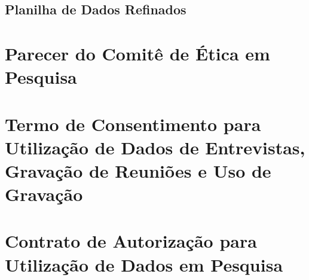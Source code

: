 \begin{anexosenv}
\begin{landscape}
    \chapter{Planilha de Dados Refinados}
    \label{anexo:planilha-refinada}

    
    
    
    
\end{landscape}


\chapter{Parecer do Comitê de Ética em Pesquisa}
\label{anexo:parecer-cep}









\chapter{Termo de Consentimento para Utilização de Dados de Entrevistas, Gravação de Reuniões e Uso de Gravação}
\label{anexo:termo-consentimento}






\chapter{Contrato de Autorização para Utilização de Dados em Pesquisa}
\label{anexo:contrato-autorizacao}






\end{anexosenv}

